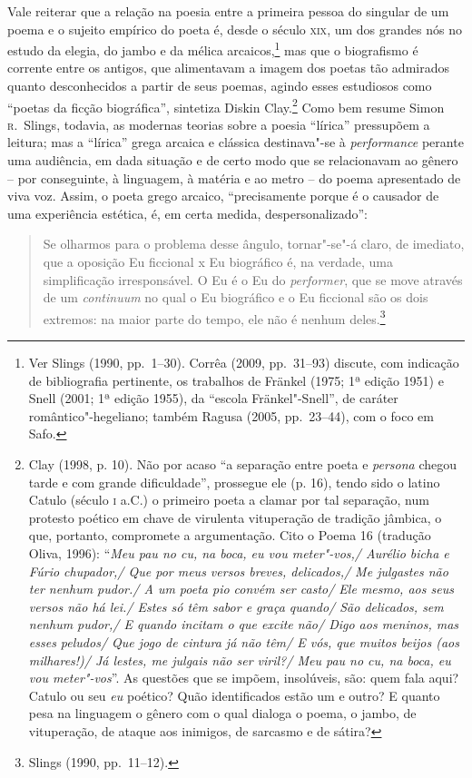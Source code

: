 Vale reiterar que a relação na poesia entre a primeira pessoa do
singular de um poema e o sujeito empírico do poeta é, desde o século \textsc{xix}, um
dos grandes nós no estudo da elegia, do jambo e da mélica arcaicos,\footnote{
Ver Slings (1990, pp.~1--30). Corrêa (2009, pp.~31--93) discute, com indicação de
bibliografia pertinente, os trabalhos de Fränkel (1975; 1ª edição
1951) e Snell (2001; 1ª edição 1955), da “escola Fränkel"-Snell”, de
caráter romântico"-hegeliano; também Ragusa (2005, pp.~23--44), com o foco em
Safo.} mas que o biografismo é corrente entre os antigos, que alimentavam a
imagem dos poetas tão admirados quanto desconhecidos a partir de seus poemas,
agindo esses estudiosos como “poetas da ficção biográfica”, sintetiza Diskin
Clay.\footnote{ Clay (1998, p. 10). Não por acaso “a separação entre poeta e
\textit{persona} chegou tarde e com grande dificuldade”, prossegue ele (p. 16),
tendo sido o latino Catulo (século \textsc{i} a.C.) o primeiro poeta a clamar por tal
separação, num protesto poético em chave de virulenta vituperação de tradição
jâmbica, o que, portanto, compromete a argumentação. Cito o Poema 16 (tradução
Oliva, 1996): ``\textit{Meu pau no cu, na boca, eu vou meter"-vos,/ Aurélio bicha
e Fúrio chupador,/ Que por meus versos breves, delicados,/ Me julgastes não
ter nenhum pudor./ A um poeta pio convém ser casto/ Ele mesmo, aos seus
versos não há lei./ Estes só têm sabor e graça quando/ São delicados, sem
nenhum pudor,/ E quando incitam o que excite não/ Digo aos meninos, mas esses
peludos/ Que jogo de cintura já não têm/ E vós, que muitos beijos (aos
milhares!)/ Já lestes, me julgais não ser viril?/ Meu pau no cu, na boca, eu
vou meter"-vos}''. As questões que se impõem, insolúveis, são: quem fala
aqui? Catulo ou seu \textit{eu} poético? Quão identificados estão um e outro? E quanto
pesa na linguagem o gênero com o qual dialoga o poema, o jambo, de vituperação,
de ataque aos inimigos, de sarcasmo e de sátira?} Como bem resume Simon \textsc{r}.~Slings, 
todavia, as modernas teorias sobre a poesia “lírica”
pressupõem a leitura; mas a “lírica” grega arcaica e clássica destinava"-se à
\textit{performance} perante uma audiência, em dada situação e de certo modo
que se relacionavam ao gênero -- por conseguinte, à linguagem, à matéria e ao
metro -- do poema apresentado de viva voz. Assim, o poeta grego arcaico,
“precisamente porque é o causador de uma experiência estética, é, em certa
medida, despersonalizado”:

\begin{quote}
Se olharmos para o problema desse ângulo, tornar"-se"-á claro, de imediato, que
a oposição Eu ficcional x Eu biográfico é, na verdade, uma simplificação
irresponsável. O Eu é o Eu do \textit{performer}, que se move através de um
\textit{continuum} no qual o Eu biográfico e o Eu ficcional são os dois
extremos: na maior parte do tempo, ele não é nenhum deles.\footnote{ Slings (1990, pp.~11--12).}
\end{quote}


